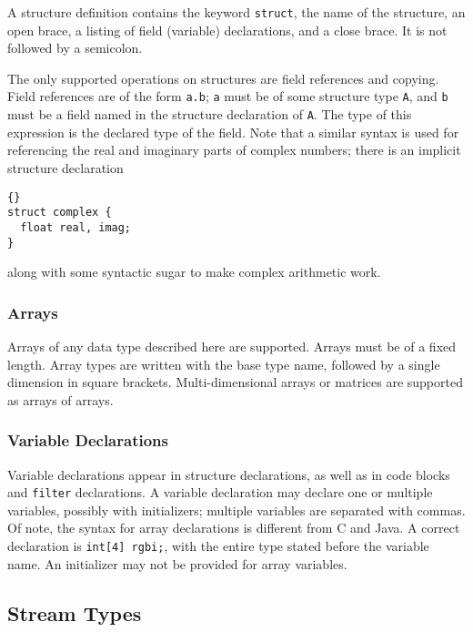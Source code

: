 \documentclass[11pt]{article}
\begin{document}
A structure definition contains the keyword \lstinline|struct|, the name
of the structure, an open brace, a listing of field (variable)
declarations, and a close brace.  It is not followed by a semicolon.

The only supported operations on structures are field references and
copying.  Field references are of the form \lstinline|a.b|; \lstinline|a| must
be of some structure type \lstinline|A|, and \lstinline|b| must be a field named
in the structure declaration of \lstinline|A|.  The type of this expression
is the declared type of the field.  Note that a similar syntax is used
for referencing the real and imaginary parts of complex numbers; there
is an implicit structure declaration

\begin{lstlisting}{}
struct complex {
  float real, imag;
}
\end{lstlisting}{}

\noindent
along with some syntactic sugar to make complex arithmetic work.

\subsubsection{Arrays}

Arrays of any data type described here are supported.  Arrays must be
of a fixed length.  Array types are written with the base type name,
followed by a single dimension in square brackets.  Multi-dimensional
arrays or matrices are supported as arrays of arrays.

\subsubsection{Variable Declarations}

Variable declarations appear in structure declarations, as well as in
code blocks and \lstinline|filter| declarations.  A variable
declaration may declare one or multiple variables, possibly with
initializers; multiple variables are separated with commas.  Of note,
the syntax for array declarations is different from C and Java.  A
correct declaration is \lstinline|int[4] rgbi;|, with the entire type
stated before the variable name.  An initializer may not be provided
for array variables.

\subsection{Stream Types}
\end{document}
